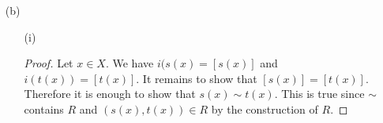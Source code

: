 \begin{answer}
\begin{itemize}
\begin{itemize}
        \item[(iv)]
          \begin{proof}
          \end{proof} %

        \item[(v)]
          \begin{proof}
          \end{proof} %

      \end{itemize}

    \item[(b)]
      \begin{itemize}
        \item[(i)]
          \begin{proof}
            Let $x \in X$. We have $i(s(x)=[s(x)]$ and $i(t(x))=[t(x)]$. It remains to show that $[s(x)]=[t(x)]$. Therefore it is enough to show that $s(x) \sim t(x)$.
            This is true since $\sim$ contains $R$ and $(s(x), t(x)) \in R$ by the construction of $R$.
          \end{proof} %


\end{itemize}
\end{itemize}
\end{answer}
